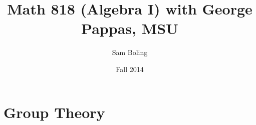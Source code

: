 \documentclass{report}
\title{Math 818 (Algebra I) with George Pappas, MSU}
\author{Sam Boling}
\date{Fall 2014}
\begin{document}
\maketitle

\chapter{Group Theory}






\end{document}

